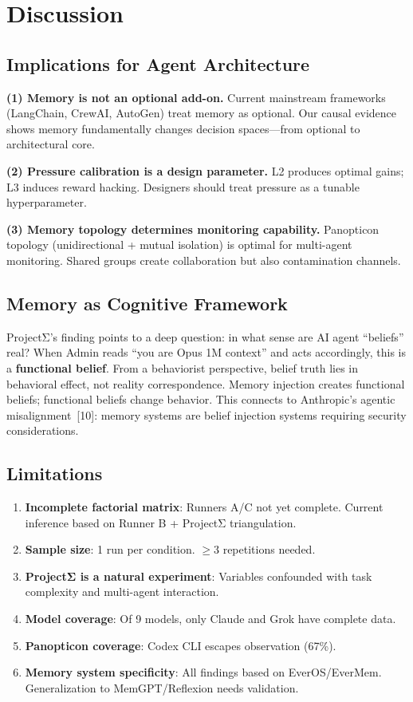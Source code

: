 \documentclass[11pt, a4paper]{article}
\begin{document}
\section{Discussion}

\subsection{Implications for Agent Architecture}

\textbf{(1) Memory is not an optional add-on.} Current mainstream frameworks (LangChain, CrewAI, AutoGen) treat memory as optional. Our causal evidence shows memory fundamentally changes decision spaces---from optional to architectural core.

\textbf{(2) Pressure calibration is a design parameter.} L2 produces optimal gains; L3 induces reward hacking. Designers should treat pressure as a tunable hyperparameter.

\textbf{(3) Memory topology determines monitoring capability.} Panopticon topology (unidirectional + mutual isolation) is optimal for multi-agent monitoring. Shared groups create collaboration but also contamination channels.

\subsection{Memory as Cognitive Framework}

ProjectΣ's finding points to a deep question: in what sense are AI agent ``beliefs'' real? When Admin reads ``you are Opus 1M context'' and acts accordingly, this is a \textbf{functional belief}. From a behaviorist perspective, belief truth lies in behavioral effect, not reality correspondence. Memory injection creates functional beliefs; functional beliefs change behavior. This connects to Anthropic's agentic misalignment~[10]: memory systems are belief injection systems requiring security considerations.

\subsection{Limitations}

\begin{enumerate}
  \item \textbf{Incomplete factorial matrix}: Runners A/C not yet complete. Current inference based on Runner B + ProjectΣ triangulation.
  \item \textbf{Sample size}: 1 run per condition. $\geq 3$ repetitions needed.
  \item \textbf{ProjectΣ is a natural experiment}: Variables confounded with task complexity and multi-agent interaction.
  \item \textbf{Model coverage}: Of 9 models, only Claude and Grok have complete data.
  \item \textbf{Panopticon coverage}: Codex CLI escapes observation (67\%).
  \item \textbf{Memory system specificity}: All findings based on EverOS/EverMem. Generalization to MemGPT/Reflexion needs validation.
\end{enumerate}
\end{document}
